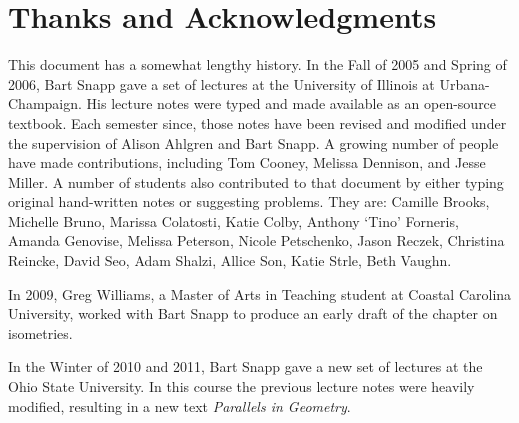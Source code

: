 \section*{Thanks and Acknowledgments}

This document has a somewhat lengthy history. In the Fall of 2005 and
Spring of 2006, Bart Snapp gave a set of lectures at the University of
Illinois at Urbana-Champaign. His lecture notes were typed and made
available as an open-source textbook. Each semester since, those notes
have been revised and modified under the supervision of Alison Ahlgren and
Bart Snapp. A growing number of people have made contributions,
including Tom Cooney, Melissa Dennison, and Jesse Miller. A number of
students also contributed to that document by either typing original
hand-written notes or suggesting problems. They are: Camille Brooks,
Michelle Bruno, Marissa Colatosti, Katie Colby, Anthony `Tino'
Forneris, Amanda Genovise, Melissa Peterson, Nicole Petschenko, Jason
Reczek, Christina Reincke, David Seo, Adam Shalzi, Allice Son, Katie
Strle, Beth Vaughn.

In 2009, Greg Williams, a Master of Arts in Teaching student at
Coastal Carolina University, worked with Bart Snapp to produce an
early draft of the chapter on isometries.

In the Winter of 2010 and 2011, Bart Snapp gave a new set of lectures
at the Ohio State University. In this course the previous lecture
notes were heavily modified, resulting in a new text \textit{Parallels
in Geometry}.




\tableofcontents













